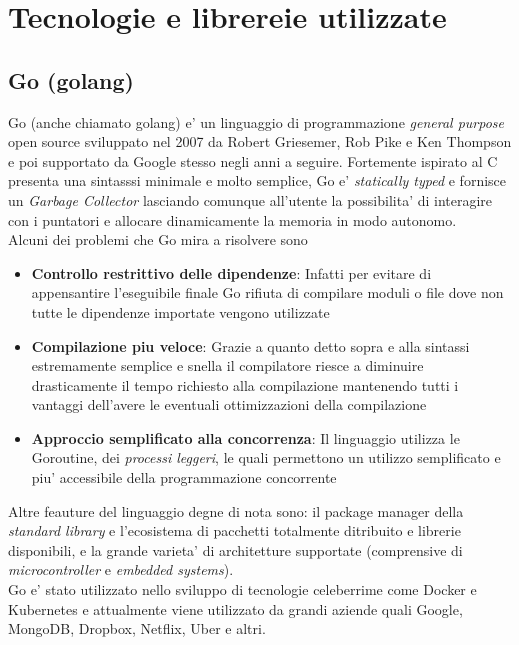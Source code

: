 \chapter{Tecnologie e librereie utilizzate}
\section{Go (golang)}
Go (anche chiamato {golang}) e' un linguaggio di programmazione \emph{general purpose} open source sviluppato nel 2007 da Robert Griesemer, Rob Pike e Ken Thompson e poi supportato da Google stesso negli anni a seguire. Fortemente ispirato al C presenta una sintasssi minimale e molto semplice, Go e' \emph{statically typed} e fornisce un \emph{Garbage Collector} lasciando comunque all'utente la possibilita' di interagire con i puntatori e allocare dinamicamente la memoria in modo autonomo.\\
Alcuni dei problemi che Go mira a risolvere sono
\begin{itemize}
    \item \textbf{Controllo restrittivo delle dipendenze}: Infatti per evitare di appensantire l'eseguibile finale Go rifiuta di compilare moduli o file dove non tutte le dipendenze importate vengono utilizzate
    \item \textbf{Compilazione piu veloce}: Grazie a quanto detto sopra e alla sintassi estremamente semplice e snella il compilatore riesce a diminuire drasticamente il tempo richiesto alla compilazione mantenendo tutti i vantaggi dell'avere le eventuali ottimizzazioni della compilazione
    \item \textbf{Approccio semplificato alla concorrenza}: Il linguaggio utilizza le Goroutine, dei \emph{processi leggeri}, le quali permettono un utilizzo semplificato e piu' accessibile della programmazione concorrente
\end{itemize}
Altre feauture del linguaggio degne di nota sono: il package manager della \emph{standard library} e l'ecosistema di pacchetti totalmente ditribuito e librerie disponibili, e la grande varieta' di architetture supportate (comprensive di \emph{microcontroller} e \emph{embedded systems}).\\
Go e' stato utilizzato nello sviluppo di tecnologie celeberrime come Docker e Kubernetes e attualmente viene utilizzato da grandi aziende quali Google, MongoDB, Dropbox, Netflix, Uber e altri.

